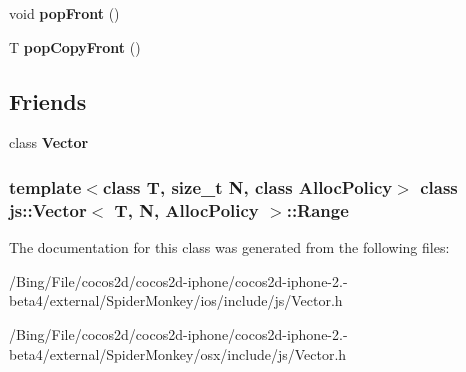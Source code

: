 \begin{DoxyCompactItemize}
\item 
\hypertarget{classjs_1_1_vector_1_1_range_a4bd00bc22c6debfd42f2ada0f85ea799}{void {\bfseries pop\-Front} ()}\label{classjs_1_1_vector_1_1_range_a4bd00bc22c6debfd42f2ada0f85ea799}

\item 
\hypertarget{classjs_1_1_vector_1_1_range_a516769ac09952bb801391b91ba4a7c65}{T {\bfseries pop\-Copy\-Front} ()}\label{classjs_1_1_vector_1_1_range_a516769ac09952bb801391b91ba4a7c65}

\end{DoxyCompactItemize}
\subsection*{Friends}
\begin{DoxyCompactItemize}
\item 
\hypertarget{classjs_1_1_vector_1_1_range_a4d8269410dcd9cadc9722e9a118bddfb}{class {\bfseries Vector}}\label{classjs_1_1_vector_1_1_range_a4d8269410dcd9cadc9722e9a118bddfb}

\end{DoxyCompactItemize}
\subsubsection*{template$<$class T, size\-\_\-t N, class Alloc\-Policy$>$ class js\-::\-Vector$<$ T, N, Alloc\-Policy $>$\-::\-Range}



The documentation for this class was generated from the following files\-:\begin{DoxyCompactItemize}
\item 
/\-Bing/\-File/cocos2d/cocos2d-\/iphone/cocos2d-\/iphone-\/2.-\/beta4/external/\-Spider\-Monkey/ios/include/js/Vector.\-h\item 
/\-Bing/\-File/cocos2d/cocos2d-\/iphone/cocos2d-\/iphone-\/2.-\/beta4/external/\-Spider\-Monkey/osx/include/js/Vector.\-h\end{DoxyCompactItemize}
